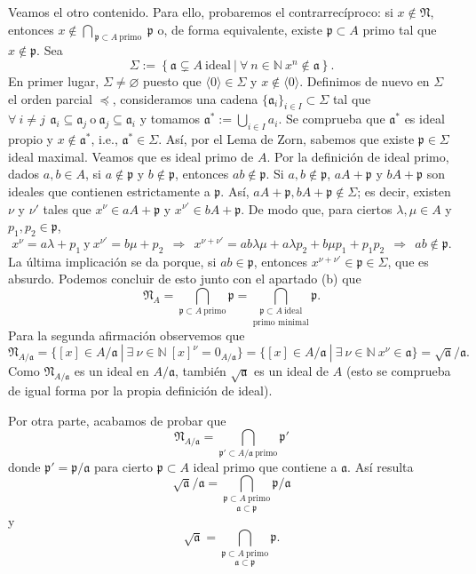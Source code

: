 \documentclass[a4paper,12pt]{article}
\newcommand{\N}{\mathbb{N}}
\newcommand{\p}{\mathfrak{p}}
\newcommand{\af}{\mathfrak{a}}
\newcommand{\Nf}{\mathfrak{N}}
\theoremstyle{definition}
\begin{document}
Veamos el otro contenido. Para ello, probaremos el contrarrecíproco: si $x\notin\Nf$, entonces $x\notin\bigcap_{\ \p\subset A\ \text{primo }}\p$ o, de forma equivalente, existe $\p\subset A$ primo tal que $x\notin\p$. Sea$$\Sigma:=\left\{\af\subsetneq A\ \text{ideal}\ |\ \forall\ n\in\N\ x^n\notin\af \right\}.$$
En primer lugar, $\Sigma\neq\varnothing$ puesto que $\langle 0\rangle\in\Sigma$ y $x\notin\langle 0\rangle$. 
Definimos de nuevo en $\Sigma$ el orden parcial $\preceq$, consideramos una cadena $\{\af_i\}_{i\in I}\subset\Sigma$ tal que $\forall\ i\neq j\hspace{5pt}\af_i\subseteq\af_j\ \text{o}\ \af_j\subseteq\af_i$ y tomamos $\af^*:=\bigcup_{i\in I}a_i$. Se comprueba que $\af^*$ es ideal propio y $x\notin\af^*$, i.e., $\af^*\in\Sigma$.\newline
Así, por el Lema de Zorn, sabemos que existe $\p\in\Sigma$ ideal maximal. Veamos que es ideal primo de $A$. Por la definición de ideal primo, dados $a,b\in A$, si $a\notin\p$ y $b\notin\p$, entonces $ab\notin\p$.
Si $a,b\notin\p$, $aA+\p$ y $bA+\p$ son ideales que contienen estrictamente a $\p$. Así, $aA+\p,bA+\p\notin\Sigma$; es decir, existen $\nu$ y $\nu'$ tales que $x^\nu\in aA+\p$ y $x^{\nu'}\in bA+\p$. 
De modo que, para ciertos $\lambda,\mu\in A$ y $p_1,p_2\in\p$,$$x^\nu=a\lambda+p_1\ \text{y}\  x^{\nu'}=b\mu+p_2~~\Rightarrow~~ x^{\nu+\nu'}=ab\lambda\mu+a\lambda p_2+b\mu p_1+p_1p_2~~\Rightarrow~~ ab\notin\p.$$
La última implicación se da porque, si $ab\in\p$, entonces $x^{\nu+\nu'}\in\p\in\Sigma$, que es absurdo.\newline
Podemos concluir de esto junto con el apartado (b) que$$\Nf_A=\underset{\p\subset A\ \text{primo}}{\bigcap}\p=\underset{\text{primo minimal}}{\bigcap_{\p\subset A\ \text{ideal}}}\p.$$
Para la segunda afirmación observemos que$$\Nf_{A/\af}=\{[x]\in A/\af\ |\ \exists\ \nu\in\N\ {[x]}^\nu=0_{A/\af}\}=\{[x]\in A/\af\ |\ \exists\ \nu\in\N\ x^\nu\in\af\}=\sqrt{\af}/\af.$$
Como $\Nf_{A/\af}$ es un ideal en $A/\af$, también $\sqrt{\af}$ es un ideal de $A$ (esto se comprueba de igual forma por la propia definición de ideal).

Por otra parte, acabamos de probar que$$\Nf_{A/\af}=\underset{\p'\subset A/\af\ \text{primo}}{\bigcap}\p'$$donde $\p'=\p/\af$ para cierto $\p\subset A$ ideal primo que contiene a $\af$.
Así resulta$$\sqrt{\af}/\af=\underset{\af\subset\p}{\bigcap_{\p\subset A\ \text{primo}}}\p/\af$$y$$\sqrt{\af}=\underset{\af\subset\p}{\bigcap_{\p\subset A\ \text{primo}}}\p.$$
\end{document}
